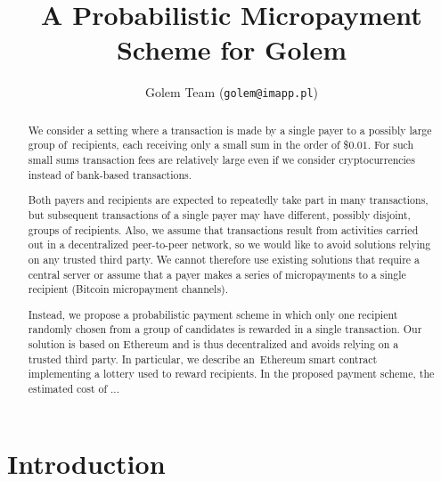 \documentclass[a4paper]{article}
\title{A Probabilistic Micropayment Scheme for Golem}
\author{Golem Team (\texttt{golem@imapp.pl})}
\begin{document}
\maketitle

\begin{abstract}
    We consider a setting where a transaction is made by a single payer
    to a possibly large group of~recipients, each receiving only a small
    sum in the order of \$$0.01$. For such small sums transaction fees are
    relatively large even if we consider cryptocurrencies instead of
    bank-based transactions.

    Both payers and recipients are expected to repeatedly take part in
    many transactions, but subsequent transactions of a single payer may
    have different, possibly disjoint, groups of recipients. Also, we
    assume that transactions result from activities carried out in a
    decentralized peer-to-peer network, so we would like to avoid
    solutions relying on any trusted third party. We cannot therefore use
    existing solutions that require a central server or assume that a
    payer makes a series of micropayments to a single recipient (Bitcoin
    micropayment channels).

    Instead, we propose a probabilistic payment scheme in which only one
    recipient randomly chosen from a group of candidates is rewarded in
    a single transaction. Our solution is based on Ethereum and is thus
    decentralized and avoids relying on a trusted third party. In
    particular, we describe an~Ethereum smart contract implementing a
    lottery used to reward recipients. In the proposed payment scheme,
    the estimated cost of ...
\end{abstract}

\section{Introduction}
\end{document}
